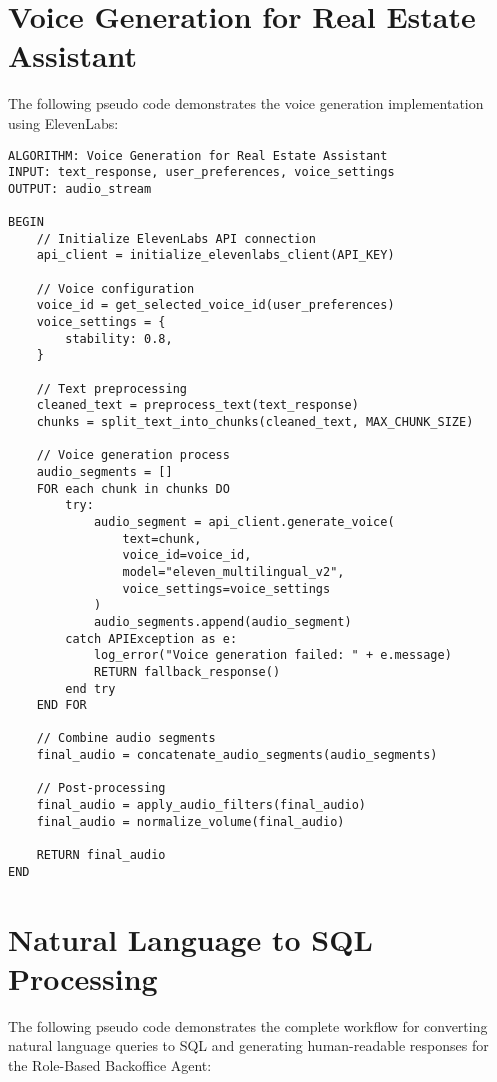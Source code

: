 \chapter*{Voice Generation for Real Estate Assistant}
\label{app:B}

The following pseudo code demonstrates the voice generation implementation using ElevenLabs:

\begin{verbatim}
ALGORITHM: Voice Generation for Real Estate Assistant
INPUT: text_response, user_preferences, voice_settings
OUTPUT: audio_stream

BEGIN
    // Initialize ElevenLabs API connection
    api_client = initialize_elevenlabs_client(API_KEY)
    
    // Voice configuration
    voice_id = get_selected_voice_id(user_preferences)
    voice_settings = {
        stability: 0.8,
    }
    
    // Text preprocessing
    cleaned_text = preprocess_text(text_response)
    chunks = split_text_into_chunks(cleaned_text, MAX_CHUNK_SIZE)
    
    // Voice generation process
    audio_segments = []
    FOR each chunk in chunks DO
        try:
            audio_segment = api_client.generate_voice(
                text=chunk,
                voice_id=voice_id,
                model="eleven_multilingual_v2",
                voice_settings=voice_settings
            )
            audio_segments.append(audio_segment)
        catch APIException as e:
            log_error("Voice generation failed: " + e.message)
            RETURN fallback_response()
        end try
    END FOR
    
    // Combine audio segments
    final_audio = concatenate_audio_segments(audio_segments)
    
    // Post-processing
    final_audio = apply_audio_filters(final_audio)
    final_audio = normalize_volume(final_audio)
    
    RETURN final_audio
END
\end{verbatim}

\chapter*{Natural Language to SQL Processing}
\label{app:C}

The following pseudo code demonstrates the complete workflow for converting natural language queries to SQL and generating human-readable responses for the Role-Based Backoffice Agent:

